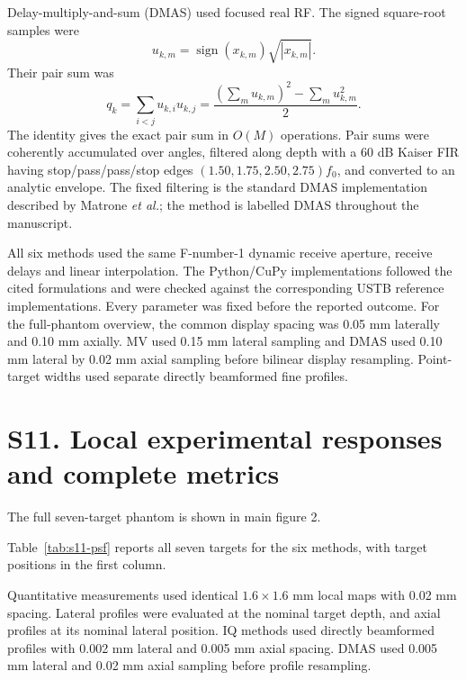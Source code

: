 \documentclass[10pt]{article}
\begin{document}
Delay-multiply-and-sum (DMAS) used focused real RF. The signed square-root
samples were
\begin{equation}
u_{k,m}=\operatorname{sign}(x_{k,m})\sqrt{|x_{k,m}|}.
\end{equation}
Their pair sum was
\begin{equation}
q_k=\sum_{i<j}u_{k,i}u_{k,j}
=\frac{(\sum_m u_{k,m})^2-\sum_m u_{k,m}^2}{2}.
\end{equation}
The identity gives the exact pair sum in $O(M)$ operations. Pair sums were
coherently accumulated over angles, filtered along depth with a 60 dB Kaiser
FIR having stop/pass/pass/stop edges $(1.50,1.75,2.50,2.75)f_0$, and converted
to an analytic envelope. The fixed filtering is the standard DMAS
implementation described by Matrone \textit{et al.}; the method is labelled
DMAS throughout the manuscript.

All six methods used the same F-number-1 dynamic receive aperture, receive
delays and linear interpolation. The Python/CuPy implementations followed the
cited formulations and were checked against the corresponding USTB reference
implementations. Every parameter was fixed before the reported outcome.
For the full-phantom overview, the common display spacing was 0.05 mm laterally
and 0.10 mm axially. MV used 0.15 mm lateral sampling and DMAS used 0.10 mm
lateral by 0.02 mm axial sampling before bilinear display resampling. Point-target widths used separate directly beamformed fine profiles.

\begin{table}[h]
\centering
\caption{Fixed implementation choices for the three added receive-domain
comparators. $K$ is the axial covariance half-window in samples.}
\label{tab:s10-parameters}

\end{table}

\clearpage
\section*{S11. Local experimental responses and complete metrics}

The full seven-target phantom is shown in main figure 2.

Table~\ref{tab:s11-psf}
reports all seven targets for the six methods, with target positions in the
first column.

Quantitative measurements used identical $1.6\times1.6$ mm local maps with
0.02 mm spacing. Lateral profiles were evaluated at the nominal target depth,
and axial profiles at its nominal lateral position. IQ methods used directly
beamformed profiles with 0.002 mm lateral and 0.005 mm axial spacing. DMAS used
0.005 mm lateral and 0.02 mm axial sampling before profile resampling. 
\end{document}
